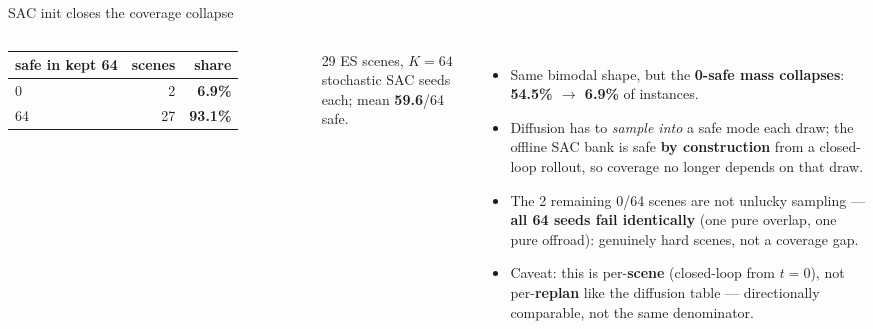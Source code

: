 \begin{frame}{SAC init closes the coverage collapse}
  \small
  \begin{columns}[T]
    \centering
    \begin{tabular}{@{}lrr@{}}
      \toprule
      safe in kept 64 & scenes & share \\
      \midrule
      0   &  2 & \textbf{6.9\%} \\
      64  & 27 & \textbf{93.1\%} \\
      \bottomrule
    \end{tabular}

    \vspace{0.5em}
    29 ES scenes, $K{=}64$ stochastic SAC seeds each; mean \textbf{59.6}/64 safe.

    \begin{itemize}
      \item Same bimodal shape, but the \textbf{0-safe mass collapses}:
            \textbf{54.5\% $\to$ 6.9\%} of instances.
      \item Diffusion has to \emph{sample into} a safe mode each draw;
            the offline SAC bank is safe \textbf{by construction} from a
            closed-loop rollout, so coverage no longer depends on that draw.
      \item The 2 remaining 0/64 scenes are not unlucky sampling ---
            \textbf{all 64 seeds fail identically} (one pure overlap, one
            pure offroad): genuinely hard scenes, not a coverage gap.
      \item Caveat: this is per-\textbf{scene} (closed-loop from $t{=}0$),
            not per-\textbf{replan} like the diffusion table --- directionally
            comparable, not the same denominator.
    \end{itemize}
  \end{columns}
\end{frame}
